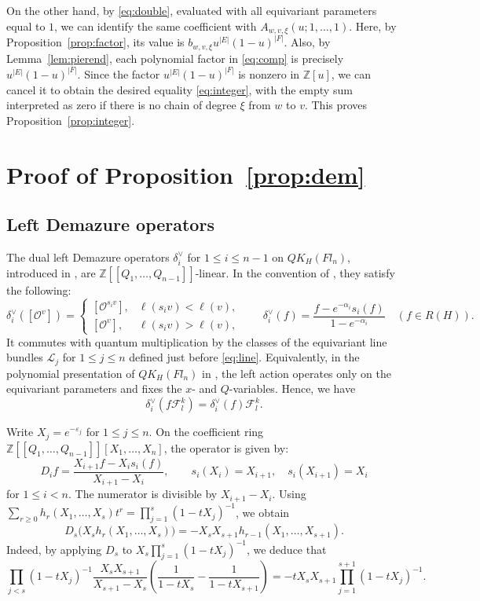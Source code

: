 \documentclass[11pt,a4paper,reqno]{amsart}
\DeclareRobustCommand{\rev}[1]{{\color{revision}#1}}
\numberwithin{equation}{section}
\theoremstyle{definition}
\newcommand{\Z}{\mathbb Z}
\newcommand{\OO}{\mathcal O}
\newcommand{\Sc}[1]{[\OO^{#1}]}
\newcommand{\eps}{\varepsilon}
\newcommand{\FF}{\mathcal F}
\begin{document}
On the other hand, by \eqref{eq:double}, evaluated with all equivariant parameters equal to \(1\), we can identify the same coefficient with \(A_{w,v,\xi}(u;1,\ldots,1)\).
Here, by Proposition~\ref{prop:factor}, its value is \(b_{w,v,\xi}u^{|E|}(1-u)^{|F|}\). Also, by Lemma~\ref{lem:pierend}, each polynomial factor in \eqref{eq:comp} is precisely \(u^{|E|}(1-u)^{|F|}\).
\rev{Since the factor \(u^{|E|}(1-u)^{|F|}\) is nonzero in \(\Z[u]\), we can cancel it to obtain the desired equality \eqref{eq:integer}, with the empty sum interpreted as zero if there is no chain of degree \(\xi\) from \(w\) to \(v\). This proves Proposition~\ref{prop:integer}.}

\section{Proof of Proposition~\ref{prop:dem}}\label{sec:dem}
\subsection{Left Demazure operators}
The dual left Demazure operators \(\delta_i^\vee\) for \(1 \le i \le n-1\) on \(QK_{H}(Fl_n)\), introduced in \cite{MNS}, are \(\Z[[Q_1,\ldots,Q_{n-1}]]\)-linear. In the convention of \cite[\S4.2]{MNS2}, they satisfy the following: 
\[
 \delta_i^\vee(\Sc{v})=
 \begin{cases}\Sc{s_iv},&\ell(s_iv)<\ell(v),\\
               \Sc{v},&\ell(s_iv)>\ell(v),
 \end{cases}
 \qquad
 \delta_i^\vee(f)=\frac{f-e^{-\alpha_i}s_i(f)}{1-e^{-\alpha_i}}
 \quad(f\in R(H)).
\]
It commutes with quantum multiplication by the classes of the equivariant line bundles \(\mathcal{L}_j\) for \(1 \le j \le n\) defined just before \eqref{eq:line}. Equivalently, in the polynomial presentation of \(QK_{H}(Fl_n)\) in \cite{MNS1,MNS2}, the left action operates only on the equivariant parameters and fixes the \(x\)- and \(Q\)-variables. Hence, we have 
\begin{equation}\label{eq:demF}
 \delta_i^\vee(f\FF_l^k)=\delta_i^\vee(f)\FF_l^k .
\end{equation}

Write \(X_j=e^{-\eps_j}\) for \(1 \le j \le n\). On the coefficient ring \(\Z[[Q_1,\ldots,Q_{n-1}]][X_1,\ldots,X_n]\), the operator is given by: 
\[
 D_if=\frac{X_{i+1}f-X_i s_i(f)}{X_{i+1}-X_i},
 \qquad s_i(X_i)=X_{i+1},\quad s_i(X_{i+1})=X_i
\]
for \(1\le i<n\). The numerator is divisible by \(X_{i+1}-X_i\). Using
\(\sum_{r\ge0}h_r(X_1,\ldots,X_s)t^r=\prod_{j=1}^s(1-tX_j)^{-1}\), 
we obtain 
\begin{equation}\label{eq:step}
 D_s\big(X_s h_r(X_1,\ldots,X_s)\big)
       =-X_sX_{s+1}h_{r-1}(X_1,\ldots,X_{s+1}) .
\end{equation}
Indeed, by applying \(D_s\) to \(X_s\prod_{j=1}^s(1-tX_j)^{-1}\), we deduce that 
\[
 \prod_{j<s}(1-tX_j)^{-1}
 \frac{X_sX_{s+1}}{X_{s+1}-X_s}
 \left(\frac{1}{1-tX_s}-\frac{1}{1-tX_{s+1}}\right)
 =-tX_sX_{s+1}\prod_{j=1}^{s+1}(1-tX_j)^{-1}.
\]
\end{document}
